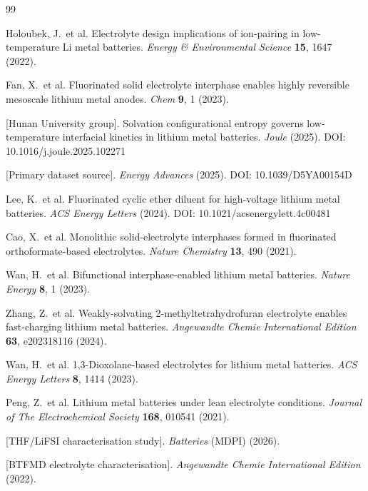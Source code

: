 \documentclass[12pt,letterpaper]{article}
\begin{document}
\begin{thebibliography}{99}

Holoubek, J.\ et al.
Electrolyte design implications of ion-pairing in
low-temperature Li metal batteries.
\textit{Energy \& Environmental Science}
\textbf{15}, 1647 (2022).

Fan, X.\ et al.
Fluorinated solid electrolyte interphase enables
highly reversible mesoscale lithium metal anodes.
\textit{Chem} \textbf{9}, 1 (2023).

[Hunan University group].
Solvation configurational entropy governs
low-temperature interfacial kinetics in lithium
metal batteries.
\textit{Joule} (2025).
DOI: 10.1016/j.joule.2025.102271

[Primary dataset source].
\textit{Energy Advances} (2025).
DOI: 10.1039/D5YA00154D

Lee, K.\ et al.
Fluorinated cyclic ether diluent for high-voltage
lithium metal batteries.
\textit{ACS Energy Letters} (2024).
DOI: 10.1021/acsenergylett.4c00481

Cao, X.\ et al.
Monolithic solid-electrolyte interphases formed in
fluorinated orthoformate-based electrolytes.
\textit{Nature Chemistry} \textbf{13}, 490 (2021).

Wan, H.\ et al.
Bifunctional interphase-enabled lithium metal batteries.
\textit{Nature Energy} \textbf{8}, 1 (2023).

Zhang, Z.\ et al.
Weakly-solvating 2-methyltetrahydrofuran electrolyte
enables fast-charging lithium metal batteries.
\textit{Angewandte Chemie International Edition}
\textbf{63}, e202318116 (2024).

Wan, H.\ et al.
1,3-Dioxolane-based electrolytes for lithium metal
batteries.
\textit{ACS Energy Letters} \textbf{8}, 1414 (2023).

Peng, Z.\ et al.
Lithium metal batteries under lean electrolyte
conditions.
\textit{Journal of The Electrochemical Society}
\textbf{168}, 010541 (2021).

[THF/LiFSI characterisation study].
\textit{Batteries} (MDPI) (2026).

[BTFMD electrolyte characterisation].
\textit{Angewandte Chemie International Edition}
(2022).


\end{thebibliography}
\end{document}

